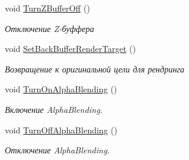 \begin{DoxyCompactItemize}
void \hyperlink{class_d3_d_class_a0ce8c7cdc83be369a23bebcb4c7f4ee7}{Turn\+Z\+Buffer\+Off} ()
\begin{DoxyCompactList}\small\item\em Отключение Z-\/буффера \end{DoxyCompactList}\item 
void \hyperlink{class_d3_d_class_ae3bd683d33b266b756bf49233742cf3c}{Set\+Back\+Buffer\+Render\+Target} ()
\begin{DoxyCompactList}\small\item\em Возвращение к оригинальной цели для рендринга \end{DoxyCompactList}\item 
void \hyperlink{class_d3_d_class_acafeb301530c5dfe03f14e630f0a56db}{Turn\+On\+Alpha\+Blending} ()
\begin{DoxyCompactList}\small\item\em Включение Alpha\+Blending. \end{DoxyCompactList}\item 
void \hyperlink{class_d3_d_class_ad5cd8ffba823780cbd4fe53adae4f6e8}{Turn\+Off\+Alpha\+Blending} ()
\begin{DoxyCompactList}\small\item\em Отключение Alpha\+Blending. \end{DoxyCompactList}\end{DoxyCompactItemize}
